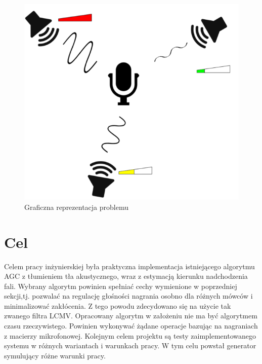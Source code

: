 \begin{figure}[h]
    \centering
    \includegraphics[width=\textwidth]{Images/setup.png}
    \caption{Graficzna reprezentacja problemu}
    \label{fig:setup}
\end{figure}

\section{Cel}
Celem pracy inżynierskiej była praktyczna implementacja istniejącego algorytmu AGC z tłumieniem tła akustycznego, wraz z estymacją kierunku nadchodzenia fali. Wybrany algorytm powinien spełniać cechy wymienione w poprzedniej sekcji,tj. pozwalać na regulację głośności nagrania osobno dla różnych mówców i minimalizować zakłócenia. Z tego powodu zdecydowano się na użycie tak zwanego filtra LCMV. Opracowany algorytm w założeniu nie ma być algorytmem czasu rzeczywistego. Powinien wykonywać żądane operacje bazując na nagraniach z macierzy mikrofonowej. Kolejnym celem projektu są testy zaimplementowanego systemu w różnych wariantach i warunkach pracy. W tym celu powstał generator symulujący różne warunki pracy.


